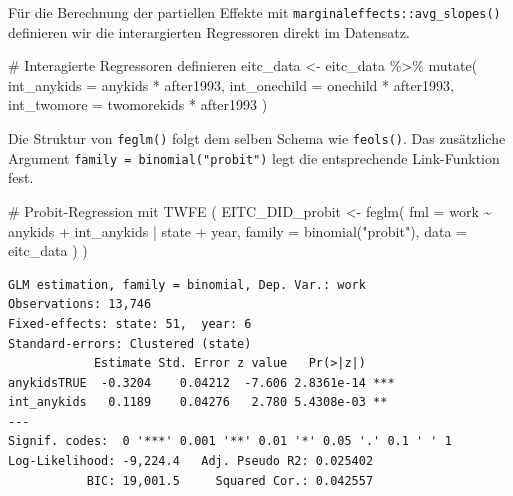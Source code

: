 \documentclass[
  a4paper,
  DIV=11,
  oneside]{scrreprt}
\newenvironment{Shaded}{\begin{snugshade}}{\end{snugshade}}
\newcommand{\AttributeTok}[1]{\textcolor[rgb]{0.40,0.45,0.13}{#1}}
\newcommand{\CommentTok}[1]{\textcolor[rgb]{0.37,0.37,0.37}{#1}}
\newcommand{\FunctionTok}[1]{\textcolor[rgb]{0.28,0.35,0.67}{#1}}
\newcommand{\NormalTok}[1]{\textcolor[rgb]{0.00,0.23,0.31}{#1}}
\newcommand{\OtherTok}[1]{\textcolor[rgb]{0.00,0.23,0.31}{#1}}
\newcommand{\SpecialCharTok}[1]{\textcolor[rgb]{0.37,0.37,0.37}{#1}}
\newcommand{\StringTok}[1]{\textcolor[rgb]{0.13,0.47,0.30}{#1}}
\begin{document}
Für die Berechnung der partiellen Effekte mit
\texttt{marginaleffects::avg\_slopes()} definieren wir die
interargierten Regressoren direkt im Datensatz.

\begin{Shaded}
\begin{Highlighting}[]
\CommentTok{\# Interagierte Regressoren definieren}
\NormalTok{eitc\_data }\OtherTok{\textless{}{-}}\NormalTok{ eitc\_data }\SpecialCharTok{\%\textgreater{}\%} 
  \FunctionTok{mutate}\NormalTok{(}
    \AttributeTok{int\_anykids =}\NormalTok{ anykids }\SpecialCharTok{*}\NormalTok{ after1993,}
    \AttributeTok{int\_onechild =}\NormalTok{ onechild }\SpecialCharTok{*}\NormalTok{ after1993,}
    \AttributeTok{int\_twomore =}\NormalTok{ twomorekids }\SpecialCharTok{*}\NormalTok{ after1993}
\NormalTok{  )}
\end{Highlighting}
\end{Shaded}

Die Struktur von \texttt{feglm()} folgt dem selben Schema wie
\texttt{feols()}. Das zusätzliche Argument
\texttt{family\ =\ binomial("probit")} legt die entsprechende
Link-Funktion fest.

\begin{Shaded}
\begin{Highlighting}[]
\CommentTok{\# Probit{-}Regression mit TWFE}
\NormalTok{(}
\NormalTok{  EITC\_DID\_probit }\OtherTok{\textless{}{-}} \FunctionTok{feglm}\NormalTok{(}
    \AttributeTok{fml =}\NormalTok{ work }\SpecialCharTok{\textasciitilde{}}\NormalTok{ anykids }\SpecialCharTok{+}\NormalTok{ int\_anykids}
    \SpecialCharTok{|}\NormalTok{ state }\SpecialCharTok{+}\NormalTok{ year, }
    \AttributeTok{family =} \FunctionTok{binomial}\NormalTok{(}\StringTok{"probit"}\NormalTok{),}
    \AttributeTok{data =}\NormalTok{ eitc\_data}
\NormalTok{  )}
\NormalTok{)}
\end{Highlighting}
\end{Shaded}

\begin{verbatim}
GLM estimation, family = binomial, Dep. Var.: work
Observations: 13,746
Fixed-effects: state: 51,  year: 6
Standard-errors: Clustered (state) 
            Estimate Std. Error z value   Pr(>|z|)    
anykidsTRUE  -0.3204    0.04212  -7.606 2.8361e-14 ***
int_anykids   0.1189    0.04276   2.780 5.4308e-03 ** 
---
Signif. codes:  0 '***' 0.001 '**' 0.01 '*' 0.05 '.' 0.1 ' ' 1
Log-Likelihood: -9,224.4   Adj. Pseudo R2: 0.025402
           BIC: 19,001.5     Squared Cor.: 0.042557
\end{verbatim}
\end{document}

